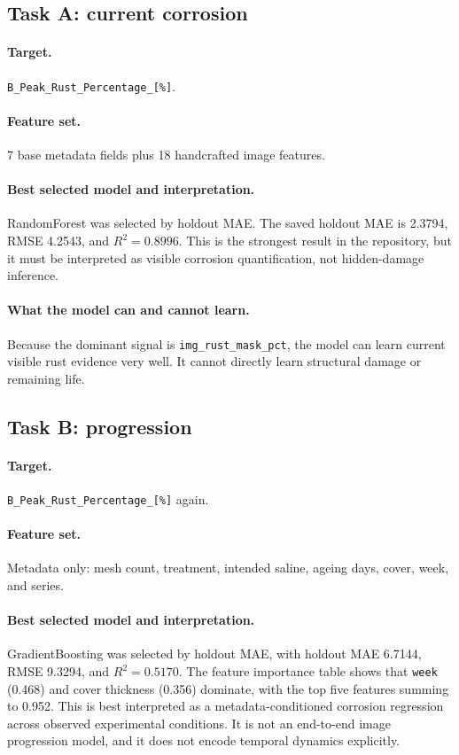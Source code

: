 \documentclass[11pt]{article}
\begin{document}
\subsection{Task A: current corrosion}
\paragraph{Target.}
\texttt{B\_Peak\_Rust\_Percentage\_[\%]}.

\paragraph{Feature set.}
7 base metadata fields plus 18 handcrafted image features.

\paragraph{Best selected model and interpretation.}
RandomForest was selected by holdout MAE. The saved holdout MAE is 2.3794, RMSE 4.2543, and \(R^2=0.8996\). This is the strongest result in the repository, but it must be interpreted as visible corrosion quantification, not hidden-damage inference.

\paragraph{What the model can and cannot learn.}
Because the dominant signal is \texttt{img\_rust\_mask\_pct}, the model can learn current visible rust evidence very well. It cannot directly learn structural damage or remaining life.

\subsection{Task B: progression}
\paragraph{Target.}
\texttt{B\_Peak\_Rust\_Percentage\_[\%]} again.

\paragraph{Feature set.}
Metadata only: mesh count, treatment, intended saline, ageing days, cover, week, and series.

\paragraph{Best selected model and interpretation.}
GradientBoosting was selected by holdout MAE, with holdout MAE 6.7144, RMSE 9.3294, and \(R^2=0.5170\). The feature importance table shows that \texttt{week} (0.468) and cover thickness (0.356) dominate, with the top five features summing to 0.952. This is best interpreted as a metadata-conditioned corrosion regression across observed experimental conditions. It is not an end-to-end image progression model, and it does not encode temporal dynamics explicitly.
\end{document}
